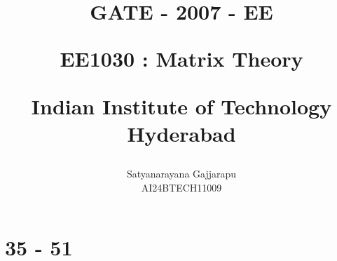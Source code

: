 \documentclass[journal]{IEEEtran}
\begin{document}

\vspace{3cm}




\title{
GATE - 2007 - EE

\large{EE1030 : Matrix Theory}

Indian Institute of Technology Hyderabad
}
\author{Satyanarayana Gajjarapu

AI24BTECH11009
}	





\maketitle




\bigskip

\renewcommand{\thefigure}{\theenumi}
\renewcommand{\thetable}{\theenumi}


\section{35 - 51}
\end{document}
